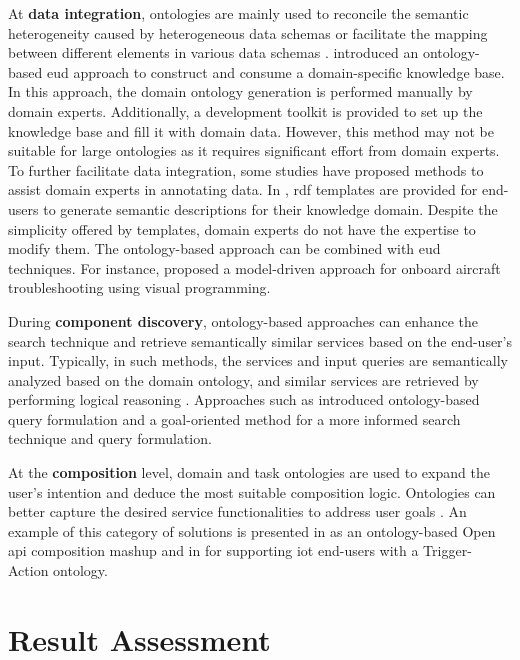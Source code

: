 At \textbf{data integration}, ontologies are mainly used to reconcile
the semantic heterogeneity caused by heterogeneous data schemas or
facilitate the mapping between different elements in various data
schemas \autocite{Daniel2014a}. \autocite{Sanctorum2022} introduced an ontology-based \gls{eud} approach to construct and
consume a domain-specific knowledge base. In this approach, the domain
ontology generation is performed manually by domain experts.
Additionally, a development toolkit is provided to set up the knowledge
base and fill it with domain data. However, this method may not be
suitable for large ontologies as it requires significant effort from domain
experts. To further facilitate data integration, some studies have
proposed methods to assist domain experts in annotating data. In
\autocite{Kawamoto2006}, \gls{rdf} templates are provided for end-users
to generate semantic descriptions for their knowledge domain. Despite
the simplicity offered by templates, domain experts do not have the
expertise to modify them. The ontology-based approach can be combined with
\gls{eud} techniques. For instance, \autocite{Dorodnykh2021} proposed a
model-driven approach for onboard aircraft troubleshooting using visual
programming.

During \textbf{component discovery}, ontology-based approaches can
enhance the search technique and retrieve semantically
similar services based on the end-user's input. Typically, in such
methods, the services and input queries are semantically analyzed based
on the domain ontology, and similar services are retrieved by
performing logical reasoning \autocite{Zhang2018}. Approaches
such as \autocite{Soylu2017, Zarei2018, Arunachalam2013, Arunachalam2013} introduced
ontology-based query formulation and a goal-oriented method for a more
informed search technique and query formulation.

At the \textbf{composition} level, domain and task ontologies are
used to expand the user's intention and deduce the most suitable
composition logic. Ontologies can better capture the desired service
functionalities to address user goals \autocite{Xiao2011}. An
example of this category of solutions is presented in \autocite{Kim2016} as an ontology-based Open \gls{api} composition mashup and in
\autocite{Debnath2022} for supporting \gls{iot} end-users with a
Trigger-Action ontology.



\hypertarget{sec:sota.assessment}{%
\section{Result Assessment}\label{sec:sota.assessment}}

